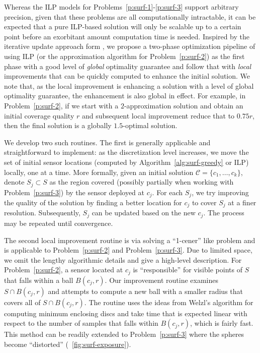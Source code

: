 Whereas the ILP models for Problems~\ref{p:surf-1}-\ref{p:surf-3} support arbitrary precision, given that these problems are all computationally intractable, it can be expected that a pure ILP-based solution will only be scalable up to a certain point before an exorbitant amount computation time is needed. Inspired by the iterative update approach form \cite{cortes2004coverage}, we propose a two-phase optimization pipeline of 
using ILP (or the approximation algorithm for Problem~\ref{p:surf-2}) as the first phase with a good level of \emph{global} optimality guarantee and follow that with \emph{local} improvements that can be quickly computed to enhance the initial solution. We note that, as the local improvement is enhancing a solution with a level of global optimality guarantee, the enhancement is also global in effect. For example, in Problem~\ref{p:surf-2}, if we start with a $2$-approximation solution and obtain an initial coverage quality $r$ and subsequent local improvement reduce that to $0.75r$, then the final solution is a globally $1.5$-optimal solution.

We develop two such routines. The first is generally applicable and straightforward to implement: as the discretization level increases, we move the set of initial sensor locations (computed by Algorithm~\ref{alg:surf-greedy} or ILP) locally, one at a time. More formally, given an initial solution $\mathcal C = \{c_1, \dots, c_k\}$, denote $S_j \subset S$ as the region covered (possibly partially when working with Problem~\ref{p:surf-3}) by the sensor deployed at $c_j$. For each $S_j$, we try improving the quality of the solution by finding a better location for $c_j$ to cover $S_j$ at a finer resolution. Subsequently, $S_j$ can be updated based on the new $c_j$. The process may be repeated until convergence. 

The second local improvement routine is via solving a ``1-cener'' like problem 
and is applicable to Problem~\ref{p:surf-2} and Problem~\ref{p:surf-3}. Due to limited space, 
we omit the lengthy algorithmic details and give a high-level description. 
For Problem~\ref{p:surf-2}, a sensor located at $c_j$ is ``responsible'' for visible points of $S$ 
that falls within a ball $B(c_j, r)$. 
Our improvement routine examines $S \cap B(c_j, r)$ and attempts to compute a new ball with 
a smaller radius that covers all of $S \cap B(c_j, r)$. 
The routine uses the ideas from Welzl's algorithm for computing minimum enclosing discs \cite{welzl1991smallest, Mark1997computation} and take time that is expected linear with respect to the number of samples that falls within $B(c_j, r)$, which is fairly fast. This method can be readily extended to Problem~\ref{p:surf-3} 
where the spheres become ``distorted'' (~\ref{fig:surf-exposure}).
